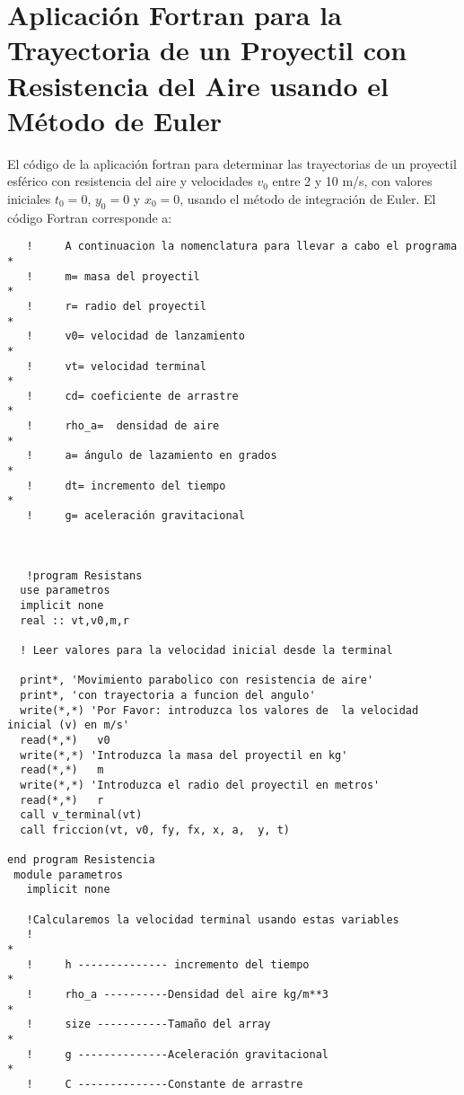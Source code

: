 \documentclass[12pt,a4paper,twoside]{article}
\begin{document}
\section{Aplicación Fortran para la Trayectoria de un Proyectil con Resistencia del Aire usando el Método de Euler}
El código de la aplicación fortran para determinar las trayectorias de un proyectil esférico con resistencia del aire y velocidades $v_{0}$ entre 2 y 10 m/s, con valores iniciales $t_{0}=0$, $y_{0}=0$ y $x_{0}=0$, usando el método de integración de Euler.
El código Fortran corresponde a:
\begin{verbatim}
   !     A continuacion la nomenclatura para llevar a cabo el programa                                                                                           *
   !     m= masa del proyectil                                                         *
   !     r= radio del proyectil                                                        *
   !     v0= velocidad de lanzamiento                                                   *
   !     vt= velocidad terminal                                                         *
   !     cd= coeficiente de arrastre                                                    *
   !     rho_a=  densidad de aire                                                           *
   !     a= ángulo de lazamiento en grados                                             *
   !     dt= incremento del tiempo                                                      *
   !     g= aceleración gravitacional    
   
   
   
   !program Resistans                                                      
  use parametros  
  implicit none
  real :: vt,v0,m,r

  ! Leer valores para la velocidad inicial desde la terminal
  
  print*, 'Movimiento parabolico con resistencia de aire'
  print*, 'con trayectoria a funcion del angulo'
  write(*,*) 'Por Favor: introduzca los valores de  la velocidad inicial (v) en m/s'
  read(*,*)   v0
  write(*,*) 'Introduzca la masa del proyectil en kg'
  read(*,*)   m
  write(*,*) 'Introduzca el radio del proyectil en metros'
  read(*,*)   r
  call v_terminal(vt)
  call friccion(vt, v0, fy, fx, x, a,  y, t)
  
end program Resistencia
 module parametros 
   implicit none

   !Calcularemos la velocidad terminal usando estas variables 
   !                                                                                                 *
   !     h -------------- incremento del tiempo                                                      *
   !     rho_a ----------Densidad del aire kg/m**3                                                   *
   !     size -----------Tamaño del array                                                            *
   !     g --------------Aceleración gravitacional                                                   *
   !     C --------------Constante de arrastre                                                    


\end{verbatim}
\end{document}
